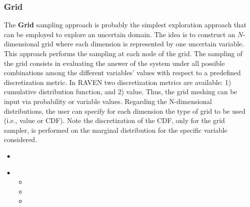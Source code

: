 \subsubsection{Grid}
\label{subsubsubsec:Grid}
The \textbf{Grid} sampling approach is probably the simplest exploration
approach that can be employed to explore an uncertain domain.
%
The idea is to construct an $N$-dimensional grid where each dimension is
represented by one uncertain variable.
%
This approach performs the sampling at each node of the grid.
%
The sampling of the grid consists in evaluating the answer of the system under
all possible combinations among the different variables' values with respect to
a predefined discretization metric.
%
In RAVEN two discretization metrics are available: 1) cumulative distribution
function, and 2) value.
%
Thus, the grid meshing can be input via probability or variable values.
%
Regarding the N-dimensional distributions, the user can specify for each dimension the type of grid to be used (i.e., value or CDF). Note the discretization of the CDF, only for the grid sampler, is performed on the marginal distribution for the specific variable considered.

%
\attrIntro
\begin{itemize}
\itemsep0em
\item \nameDescription
\end{itemize}
\begin{itemize}
\item \variableDescription
 \variableChildrenIntro
 \begin{itemize}
    \item \distributionDescription
    \item \functionDescription
    \item \gridDescription
  \end{itemize}
\end{itemize}



